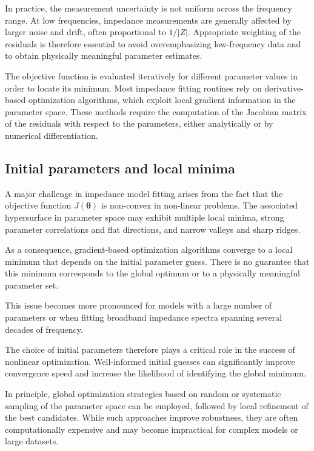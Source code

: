 In practice, the measurement uncertainty is not uniform across the frequency range.
At low frequencies, impedance measurements are generally affected by larger noise and drift, often proportional to  \(1/|Z|\).
Appropriate weighting of the residuals is therefore essential to avoid overemphasizing low-frequency data and to obtain physically meaningful parameter estimates.

The objective function is evaluated iteratively for different parameter values in order to locate its minimum.
Most impedance fitting routines rely on derivative-based optimization algorithms, which exploit local gradient information in the parameter space.
These methods require the computation of the Jacobian matrix of the residuals with respect to the parameters, either analytically or by numerical differentiation.

\subsection{Initial parameters and local minima}

A major challenge in impedance model fitting arises from the fact that the objective function \( J(\boldsymbol{\theta}) \) is non-convex in non-linear problems.
The associated hypersurface in parameter space may exhibit multiple local minima, strong parameter correlations and flat directions, and narrow valleys and sharp ridges.

As a consequence, gradient-based optimization algorithms converge to a local minimum that depends on the initial parameter guess.
There is no guarantee that this minimum corresponds to the global optimum or to a physically meaningful parameter set.

This issue becomes more pronounced for models with a large number of parameters or when fitting broadband impedance spectra spanning several decades of frequency.

The choice of initial parameters therefore plays a critical role in the success of nonlinear optimization.
Well-informed initial guesses can significantly improve convergence speed and increase the likelihood of identifying the global minimum.

In principle, global optimization strategies based on random or systematic sampling of the parameter space can be employed, followed by local refinement of the best candidates.
While such approaches improve robustness, they are often computationally expensive and may become impractical for complex models or large datasets.

















